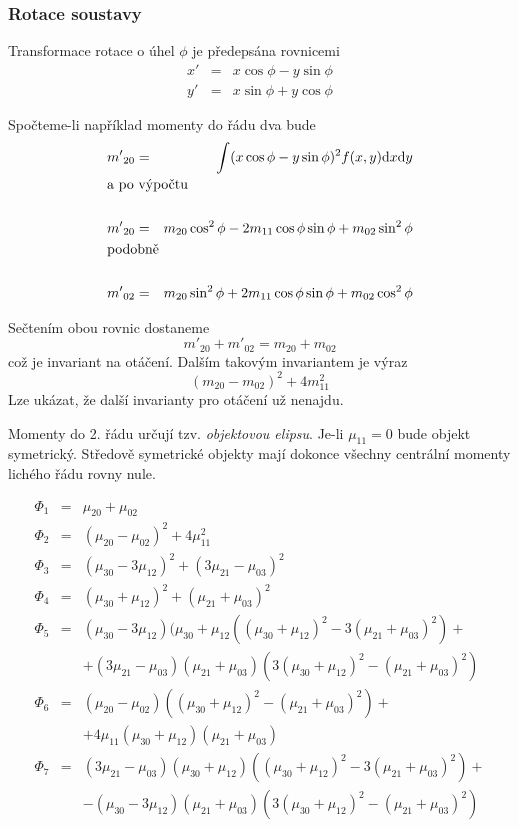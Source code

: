 \subsubsection{Rotace soustavy}
Transformace rotace o úhel $\phi$ je předepsána rovnicemi
\begin{eqnarray}
x'&=&x\cos\phi-y\sin\phi\nonumber\\
y'&=&x\sin\phi+y\cos\phi
\end{eqnarray}

Spočteme-li například momenty do řádu dva bude
\begin{eqnarray}
{m'}_{20}&=&\int(x\cos\phi-y\sin\phi)^2f(x,y)\d x\d y\\
\noalign{\hbox{a po výpočtu}\nonumber}\\
{m'}_{20}&=& m_{20}\cos^2\phi-2m_{11}\cos\phi\sin\phi +m_{02}\sin^2\phi \\
\noalign{\hbox{podobně}\nonumber}\\
{m'}_{02}&=& m_{20}\sin^2\phi+2m_{11}\cos\phi\sin\phi +m_{02}\cos^2\phi 
\end{eqnarray}

\noindent Sečtením obou rovnic dostaneme
\begin{equation}
{m'}_{20}+{m'}_{02}=m_{20}+m_{02}
\end{equation}
\noindent což je invariant na otáčení. Dalším takovým invariantem je výraz
\begin{equation}
(m_{20}-m_{02})^2+4m^2_{11}
\end{equation}
Lze ukázat, že další invarianty pro otáčení už nenajdu.

Momenty do 2. řádu určují tzv. {\em objektovou elipsu}. Je-li $\mu_{11}=0$ bude objekt symetrický.
Středově symetrické objekty mají dokonce všechny centrální momenty lichého řádu rovny nule.

\begin{eqnarray}
\Phi_1&=&\mu_{20}+\mu_{02}\\
\Phi_2&=&(\mu_{20}-\mu_{02})^2+4\mu^2_{11}\\
\Phi_3&=&(\mu_{30}-3\mu_{12})^2+(3\mu_{21}-\mu_{03})^2\\
\Phi_4&=&(\mu_{30}+\mu_{12})^2+(\mu_{21}+\mu_{03})^2\\
\Phi_5&=&(\mu_{30}-3\mu_{12})(\mu_{30}+\mu_{12}((\mu_{30}+\mu_{12})^2-3(\mu_{21}+\mu_{03})^2)+\nonumber\\
&&+(3\mu_{21}-\mu_{03})(\mu_{21}+\mu_{03})(3(\mu_{30}+\mu_{12})^2-(\mu_{21}+\mu_{03})^2)\\
\Phi_6&=&(\mu_{20}-\mu_{02})((\mu_{30}+\mu_{12})^2-(\mu_{21}+\mu_{03})^2)+\nonumber\\
&&+4\mu_{11}(\mu_{30}+\mu_{12})(\mu_{21}+\mu_{03})\\
\Phi_7&=&(3\mu_{21}-\mu_{03})(\mu_{30}+\mu_{12})((\mu_{30}+\mu_{12})^2-3(\mu_{21}+\mu_{03})^2)+\nonumber\\
&&-(\mu_{30}-3\mu_{12})(\mu_{21}+\mu_{03})(3(\mu_{30}+\mu_{12})^2-(\mu_{21}+\mu_{03})^2)
\end{eqnarray}

